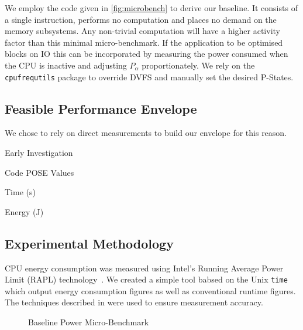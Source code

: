 We employ the code given in \autoref{fig:microbench} to derive our baseline.  It consists of a single instruction, performs no computation and places no demand on the memory subsystems. Any non-trivial computation will have a higher activity factor than this minimal micro-benchmark. If the application to be optimised blocks on IO this can be incorporated by measuring the power consumed when the CPU is inactive and adjusting $P_\alpha$ proportionately. We rely on the \texttt{cpufrequtils} package to override DVFS and manually set the desired P-States.

\subsection{Feasible Performance Envelope}

We chose to rely on direct measurements to build our envelope for this reason.


\begin{table}
\centering
\caption{Early Investigation}

\end{table} 



  \begin{table}
    \setlength{\tabcolsep}{.5em}
    \caption{Code POSE Values}
    \begin{subtable}{\textwidth}
    \centering
    \caption{Time (s)}
    
    \end{subtable} 
    \begin{subtable}{\textwidth}
    \centering
    \caption{Energy (J)}
    
    \end{subtable}
    \label{tab:pose_params}
  \end{table} 



\subsection{Experimental Methodology}
CPU energy consumption was measured using Intel's Running Average Power Limit (RAPL) technology~\cite{david:2010aa}.
We created a simple tool babsed on the Unix \texttt{time} which output energy consumption figures as well as conventional runtime figures.
The techniques described in \cite{hahnel:2012aa} were used to ensure measurement accuracy. 


\begin{figure}[ht]                                                               
\centering                                                                      
\lstset{basicstyle=\ttfamily\footnotesize\bfseries, frame=tb} %
              
\caption{Baseline Power Micro-Benchmark}                            
\label{fig:microbench}                                                           
\end{figure}  



